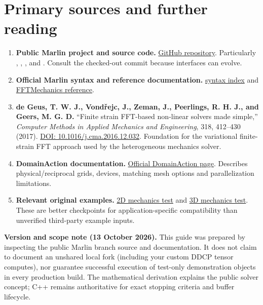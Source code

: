 \documentclass[11pt,a4paper]{article}
\newcommand{\code}[1]{\texttt{\detokenize{#1}}}
\begin{document}
\section{Primary sources and further reading}
\label{sec:references}
\begin{enumerate}
\item \textbf{Public Marlin project and source code.} \href{https://github.com/idaholab/marlin}{GitHub repository}. Particularly , , , and . Consult the checked-out commit because interfaces can evolve.
\item \textbf{Official Marlin syntax and reference documentation.} \href{https://marlin.inl.gov/syntax/index.html}{syntax index} and \href{https://marlin.inl.gov/source/tensor_computes/FFTMechanics.html}{FFTMechanics reference}.
\item \textbf{de Geus, T. W. J., Vond\v{r}ejc, J., Zeman, J., Peerlings, R. H. J., and Geers, M. G. D.} ``Finite strain FFT-based non-linear solvers made simple,'' \emph{Computer Methods in Applied Mechanics and Engineering}, 318, 412--430 (2017). \href{https://doi.org/10.1016/j.cma.2016.12.032}{DOI: 10.1016/j.cma.2016.12.032}. Foundation for the variational finite-strain FFT approach used by the heterogeneous mechanics solver.
\item \textbf{DomainAction documentation.} \href{https://marlin.inl.gov/source/actions/DomainAction.html}{Official DomainAction page}. Describes physical/reciprocal grids, devices, matching mesh options and parallelization limitations.
\item \textbf{Relevant original examples.} \href{https://github.com/idaholab/marlin/blob/devel/test/tests/mechanics/mech.i}{2D mechanics test} and \href{https://github.com/idaholab/marlin/blob/devel/test/tests/mechanics/mech3d.i}{3D mechanics test}. These are better checkpoints for application-specific compatibility than unverified third-party example inputs.
\end{enumerate}
\begin{keybox}
\textbf{Version and scope note (13 October 2026).} This guide was prepared by inspecting the public Marlin \code{devel} branch source and documentation. It does not claim to document an unshared local fork (including your custom DDCP tensor computes), nor guarantee successful execution of test-only demonstration objects in every production build. The mathematical derivation explains the public solver concept; C++ remains authoritative for exact stopping criteria and buffer lifecycle.
\end{keybox}
\end{document}
